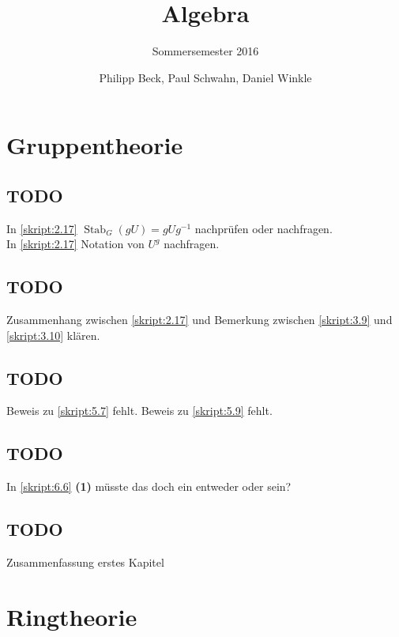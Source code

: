 \documentclass[11pt,a4paper]{scrreprt}
\author{Philipp Beck, Paul Schwahn, Daniel Winkle}
\subtitle{Sommersemester 2016}
\title{Algebra}
\newcommand{\Stab}{\operatorname{Stab}}
\theoremstyle{definition}
\theoremstyle{exercise}
\begin{document}
\maketitle
\tableofcontents
\newpage



\chapter{Gruppentheorie}



\newpage
\section*{TODO}
In \ref{skript:2.17} $\Stab_G(gU) = g U g^{-1}$ nachprüfen oder nachfragen.\\
In \ref{skript:2.17} Notation von $U^g$ nachfragen.



\newpage
\section*{TODO}
Zusammenhang zwischen \ref{skript:2.17} und Bemerkung zwischen \ref{skript:3.9} und \ref{skript:3.10} klären.



\newpage



\newpage
\section*{TODO}
Beweis zu \ref{skript:5.7} fehlt.
Beweis zu \ref{skript:5.9} fehlt.


\newpage
\section*{TODO}
In \ref{skript:6.6} \textbf{(1)} müsste das doch ein entweder oder sein?


\section*{TODO}
Zusammenfassung erstes Kapitel


\chapter{Ringtheorie}
\end{document}
